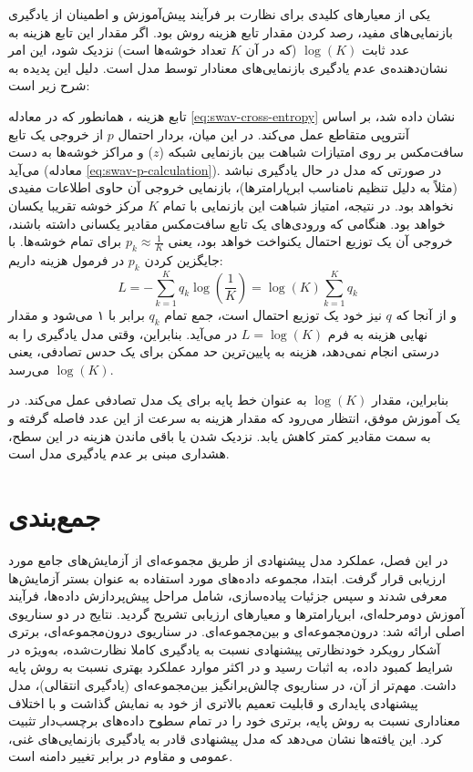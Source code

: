 یکی از معیارهای کلیدی برای نظارت بر فرآیند پیش‌آموزش و اطمینان از یادگیری بازنمایی‌های مفید، رصد کردن مقدار تابع هزینه روش  بود. اگر مقدار این تابع هزینه به عدد ثابت
$\log(K)$ (که در آن $K$ تعداد خوشه‌ها است) نزدیک شود، این امر نشان‌دهنده‌ی عدم یادگیری بازنمایی‌های معنادار توسط مدل است. دلیل این پدیده به شرح زیر است:

تابع هزینه ، همانطور که در معادله \ref{eq:swav-cross-entropy} نشان داده شد، بر اساس آنتروپی متقاطع عمل می‌کند. در این میان، بردار احتمال $p$ از خروجی یک تابع سافت‌مکس بر روی امتیازات شباهت بین بازنمایی شبکه ($z$) و مراکز خوشه‌ها به دست می‌آید (معادله \ref{eq:swav-p-calculation}). در صورتی که مدل در حال یادگیری نباشد (مثلاً به دلیل تنظیم نامناسب ابرپارامترها)، بازنمایی خروجی آن حاوی اطلاعات مفیدی نخواهد بود. در نتیجه، امتیاز شباهت این بازنمایی با تمام $K$
مرکز خوشه تقریبا یکسان خواهد بود. هنگامی که ورودی‌های یک تابع سافت‌مکس مقادیر یکسانی داشته باشند، خروجی آن یک توزیع احتمال یکنواخت خواهد بود، یعنی $p_k \approx \frac{1}{K}$ برای تمام خوشه‌ها. با جایگزین کردن $p_k$ در فرمول هزینه داریم:
\begin{equation}
    L = - \sum_{k=1}^{K} q_k \log \left( \frac{1}{K} \right) = \log(K) \sum_{k=1}^{K} q_k
\end{equation}
و از آنجا که $q$ نیز خود یک توزیع احتمال است، جمع تمام $q_k$ برابر با ۱ می‌شود و مقدار نهایی هزینه به فرم $L = \log(K)$ در می‌آید. بنابراین، وقتی مدل یادگیری را به درستی انجام نمی‌دهد، هزینه به پایین‌ترین حد ممکن برای یک حدس تصادفی، یعنی 
$\log(K)$ می‌رسد.

بنابراین، مقدار $\log(K)$ به عنوان خط پایه برای یک مدل تصادفی عمل می‌کند. در یک آموزش موفق، انتظار می‌رود که مقدار هزینه به سرعت از این عدد فاصله گرفته و به سمت مقادیر کمتر کاهش یابد. نزدیک شدن یا باقی ماندن هزینه در این سطح، هشداری مبنی بر عدم یادگیری مدل است.

\section{جمع‌بندی}

در این فصل، عملکرد مدل پیشنهادی از طریق مجموعه‌ای از آزمایش‌های جامع مورد ارزیابی قرار گرفت. ابتدا، مجموعه داده‌های مورد استفاده به عنوان بستر آزمایش‌ها معرفی شدند و سپس جزئیات پیاده‌سازی، شامل مراحل پیش‌پردازش داده‌ها، فرآیند آموزش دومرحله‌ای، ابرپارامترها و معیارهای ارزیابی تشریح گردید. نتایج در دو سناریوی اصلی ارائه شد: درون‌مجموعه‌ای و بین‌مجموعه‌ای. در سناریوی درون‌مجموعه‌ای، برتری آشکار رویکرد خودنظارتی پیشنهادی نسبت به یادگیری کاملا نظارت‌شده، به‌ویژه در شرایط کمبود داده، به اثبات رسید و در اکثر موارد عملکرد بهتری نسبت به روش پایه داشت. مهم‌تر از آن، در سناریوی چالش‌برانگیز بین‌مجموعه‌ای (یادگیری انتقالی)، مدل پیشنهادی پایداری و قابلیت تعمیم بالاتری از خود به نمایش گذاشت و با اختلاف معناداری نسبت به روش پایه، برتری خود را در تمام سطوح داده‌های برچسب‌دار تثبیت کرد. این یافته‌ها نشان می‌دهد که مدل پیشنهادی قادر به یادگیری بازنمایی‌های غنی، عمومی و مقاوم در برابر تغییر دامنه است.

